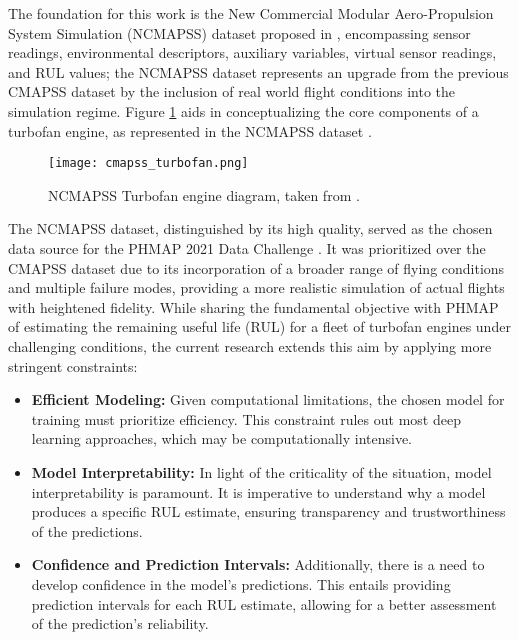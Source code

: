 \documentclass{IEEEtran}
\begin{document}
        The foundation for this work is the New Commercial Modular Aero-Propulsion System Simulation (NCMAPSS) dataset proposed in \cite{ncmapss-dataset}, encompassing sensor readings, environmental descriptors, auxiliary variables, virtual sensor readings, and RUL values; the NCMAPSS dataset represents an upgrade from the previous CMAPSS dataset by the inclusion of real world flight conditions into the simulation regime. Figure \ref{fig:turbofan_diagram} aids in conceptualizing the core components of a turbofan engine, as represented in the NCMAPSS dataset \cite{ncmapss-dataset}.
        \begin{figure}[!htbp]
            \centering
            \texttt{[image: cmapss\_turbofan.png]}
            \caption{NCMAPSS Turbofan engine diagram, taken from \cite{ncmapss-dataset}.}
            \label{fig:turbofan_diagram}
        \end{figure}

        The NCMAPSS dataset, distinguished by its high quality, served as the chosen data source for the PHMAP 2021 Data Challenge \cite{chao2021phm}. It was prioritized over the CMAPSS dataset due to its incorporation of a broader range of flying conditions and multiple failure modes, providing a more realistic simulation of actual flights with heightened fidelity. While sharing the fundamental objective with PHMAP of estimating the remaining useful life (RUL) for a fleet of turbofan engines under challenging conditions, the current research extends this aim by applying more stringent constraints:

        \begin{itemize}
            \item \textbf{Efficient Modeling:} Given computational limitations, the chosen model for training must prioritize efficiency. This constraint rules out most deep learning approaches, which may be computationally intensive.
            \item \textbf{Model Interpretability:} In light of the criticality of the situation, model interpretability is paramount. It is imperative to understand why a model produces a specific RUL estimate, ensuring transparency and trustworthiness of the predictions.
            \item \textbf{Confidence and Prediction Intervals:} Additionally, there is a need to develop confidence in the model's predictions. This entails providing prediction intervals for each RUL estimate, allowing for a better assessment of the prediction's reliability.
        \end{itemize}
\end{document}
